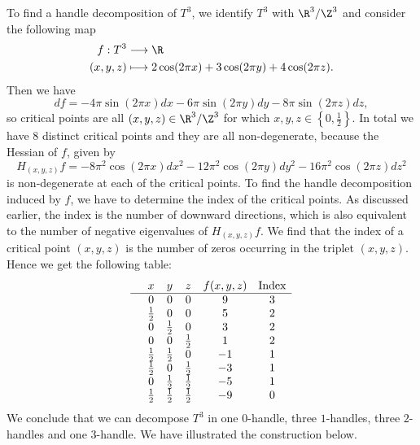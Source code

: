 \begin{eg}[$T^{3} = S^{1} \times S^{1} \times S^{1}$]
    \label{eg:handle-decomposition-three-torus}
    To find a handle decomposition of $T^3$, we identify $T^{3}$ with $\R^3 / \Z^{3}$ and consider the following map
    \begin{align*}
        f: T^{3} &\longrightarrow \R \\
        (x, y, z) &\longmapsto 2\cos (2 \pi x) + 3\cos ( 2 \pi y) + 4 \cos(2 \pi z)
    .\end{align*}
    Then we have
    \[
        df =
        -4\pi \sin (2 \pi x) dx
        -6 \pi \sin ( 2 \pi y) dy
        - 8 \pi \sin(2 \pi z) dz
    ,\] 
    so critical points are all $(x, y, z) \in \R^3 / \Z^3$ for which  $x, y, z \in \left\{0, \frac{1}{2} \right\}$.
    In total we have $8$ distinct critical points and they are all non-degenerate, because the Hessian of $f$, given by
    \[
        H_{(x, y, z)} f =
        - 8 \pi^2  \cos (2 \pi x) dx^2
        -12\pi^2 \cos ( 2 \pi y) dy^2
        -16 \pi^2 \cos(2 \pi z) dz^2
    \] 
    is non-degenerate at each of the critical points.
    To find the handle decomposition induced by $f$, we have to determine the index of the critical points.
    As discussed earlier, the index is the number of downward directions, which is also equivalent to the number of negative eigenvalues of $H_{(x, y, z)}f$.
    We find that the index of a critical point $(x, y, z)$ is the number of zeros occurring in the triplet $(x, y, z)$. Hence we get the following table:
    \[\begin{array}{cccccc}
  & x & y  & z & f(x, y, z) & \text{Index}\\ \hline
  & 0 & 0 & 0 & 9 & 3 \\
& \frac{1}{2} & 0 & 0 & 5 & 2 \\
& 0 & \frac{1}{2} & 0 & 3 & 2 \\
& 0 & 0 & \frac{1}{2} & 1 & 2 \\
& \frac{1}{2} & \frac{1}{2} & 0 & -1 & 1 \\
& \frac{1}{2} & 0 & \frac{1}{2} & -3 & 1 \\
& 0 & \frac{1}{2} & \frac{1}{2} & -5 & 1 \\
& \frac{1}{2} & \frac{1}{2} & \frac{1}{2} & -9 & 0 \\
    \end{array}\]
    We conclude that we can decompose $T^3$ in one $0$-handle, three $1$-handles, three $2$-handles and one $3$-handle. We have illustrated the construction below.


\end{eg}
